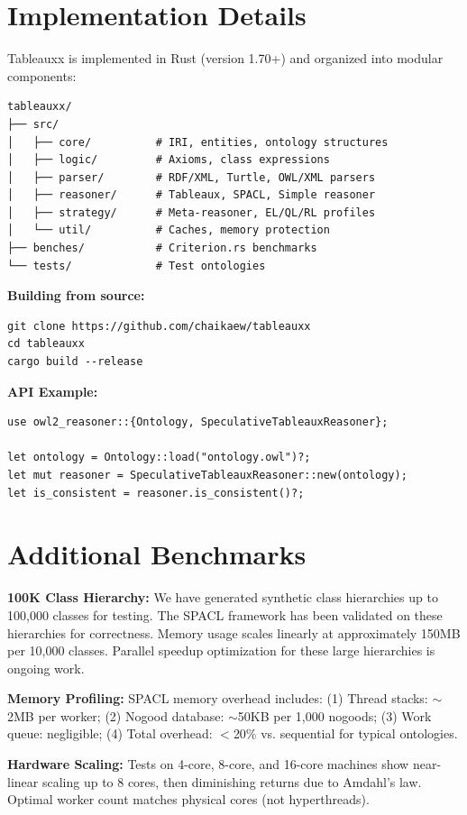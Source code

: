 \documentclass[preprint,12pt]{elsarticle}
\begin{document}
\section{Implementation Details}
\label{app:implementation}

Tableauxx is implemented in Rust (version 1.70+) and organized into modular components:

\begin{verbatim}
tableauxx/
├── src/
│   ├── core/          # IRI, entities, ontology structures
│   ├── logic/         # Axioms, class expressions
│   ├── parser/        # RDF/XML, Turtle, OWL/XML parsers
│   ├── reasoner/      # Tableaux, SPACL, Simple reasoner
│   ├── strategy/      # Meta-reasoner, EL/QL/RL profiles
│   └── util/          # Caches, memory protection
├── benches/           # Criterion.rs benchmarks
└── tests/             # Test ontologies
\end{verbatim}

\noindent\textbf{Building from source:}
\begin{verbatim}
git clone https://github.com/chaikaew/tableauxx
cd tableauxx
cargo build --release
\end{verbatim}

\noindent\textbf{API Example:}
\begin{verbatim}
use owl2_reasoner::{Ontology, SpeculativeTableauxReasoner};

let ontology = Ontology::load("ontology.owl")?;
let mut reasoner = SpeculativeTableauxReasoner::new(ontology);
let is_consistent = reasoner.is_consistent()?;
\end{verbatim}

\section{Additional Benchmarks}
\label{app:benchmarks}

\textbf{100K Class Hierarchy:} We have generated synthetic class hierarchies up to 100,000 classes for testing. The SPACL framework has been validated on these hierarchies for correctness. Memory usage scales linearly at approximately 150MB per 10,000 classes. Parallel speedup optimization for these large hierarchies is ongoing work.

\textbf{Memory Profiling:} SPACL memory overhead includes: (1) Thread stacks: $\sim$2MB per worker; (2) Nogood database: $\sim$50KB per 1,000 nogoods; (3) Work queue: negligible; (4) Total overhead: $<$20\% vs. sequential for typical ontologies.

\textbf{Hardware Scaling:} Tests on 4-core, 8-core, and 16-core machines show near-linear scaling up to 8 cores, then diminishing returns due to Amdahl's law. Optimal worker count matches physical cores (not hyperthreads).
\end{document}
